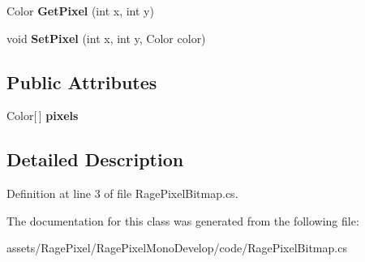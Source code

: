 \begin{DoxyCompactItemize}
\item 
\hypertarget{class_rage_pixel_bitmap_a8c143e298486a4ad4ccf36561f58c8d7}{Color {\bfseries Get\-Pixel} (int x, int y)}\label{class_rage_pixel_bitmap_a8c143e298486a4ad4ccf36561f58c8d7}

\item 
\hypertarget{class_rage_pixel_bitmap_aacfae7164b8917f94ba65a154bea5e8f}{void {\bfseries Set\-Pixel} (int x, int y, Color color)}\label{class_rage_pixel_bitmap_aacfae7164b8917f94ba65a154bea5e8f}

\end{DoxyCompactItemize}
\subsection*{Public Attributes}
\begin{DoxyCompactItemize}
\item 
\hypertarget{class_rage_pixel_bitmap_a3d2fd1bc54523d65b3e830507041bce0}{Color\mbox{[}$\,$\mbox{]} {\bfseries pixels}}\label{class_rage_pixel_bitmap_a3d2fd1bc54523d65b3e830507041bce0}

\end{DoxyCompactItemize}


\subsection{Detailed Description}


Definition at line 3 of file Rage\-Pixel\-Bitmap.\-cs.



The documentation for this class was generated from the following file\-:\begin{DoxyCompactItemize}
\item 
assets/\-Rage\-Pixel/\-Rage\-Pixel\-Mono\-Develop/code/Rage\-Pixel\-Bitmap.\-cs\end{DoxyCompactItemize}
